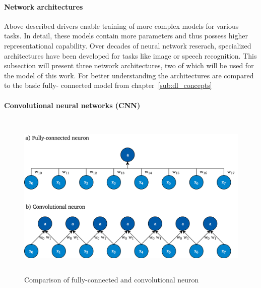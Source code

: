 \paragraph{Network architectures}
\label{sub:dl_architectures}

Above described drivers enable training of more complex models for various
tasks.
In detail, these models contain more parameters and thus possess higher
representational capability.
Over decades of neural network reserach, specialized architectures have been
developed for tasks like image or speech recognition.
This subsection will present three network architectures, two of which will
be used for the model of this work.
For better understanding the architectures are compared to the basic fully-
connected model from chapter~\ref{sub:dl_concepts}

\paragraph{Convolutional neural networks (CNN)}

\begin{figure}[h]
  \centering
  \includegraphics[height=8cm]{img/conv_layer.png}
  \caption{Comparison of fully-connected and convolutional neuron}
\label{fig:conv_layer}
\end{figure}

